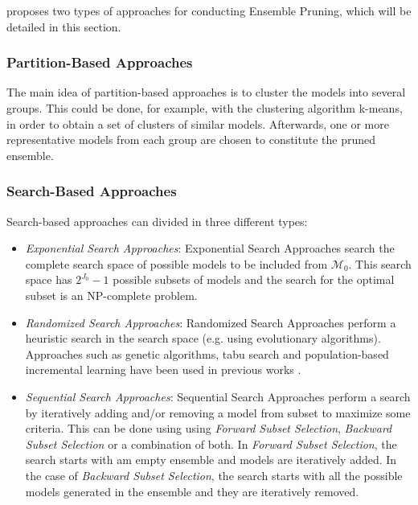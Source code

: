 
\textcite{Mendes-Moreira2012} proposes two types of approaches for conducting Ensemble Pruning, which will be detailed in this section.

\subsubsection{Partition-Based Approaches}

The main idea of partition-based approaches is to cluster the models into several groups. This could be done, for example, with the clustering algorithm k-means, in order to obtain a set of clusters of similar models.
Afterwards, one or more representative models from each group are chosen to constitute the pruned ensemble.

\subsubsection{Search-Based Approaches}

Search-based approaches can divided in three different types:

\begin{itemize}
	\item \textit{Exponential Search Approaches}: Exponential Search Approaches search the complete search space of possible models to be included from $\mathcal{M}_0$. This search space has $2^{J_0} - 1$ possible subsets of models and the search for the optimal subset is an NP-complete problem.
	
	\item \textit{Randomized Search Approaches}: Randomized Search Approaches perform a heuristic search in the search space (e.g. using evolutionary algorithms). Approaches such as genetic algorithms, tabu search and population-based incremental learning have been used in previous works \cite{Ruta2001}.
	
	\item \textit{Sequential Search Approaches}: Sequential Search Approaches perform a search by iteratively adding and/or removing a model from subset to maximize some criteria.
	This can be done using using \textit{Forward Subset Selection}, \textit{Backward Subset Selection} or a combination of both.
	In \textit{Forward Subset Selection}, the search starts with am empty ensemble and models are iteratively added.
	In the case of \textit{Backward Subset Selection}, the search starts with all the possible models generated in the ensemble and they are iteratively removed.
\end{itemize}

